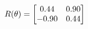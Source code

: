\documentclass[preview]{standalone}
\begin{document}
\begin{align*}
\special{dvisvgm:raw <g id='unique000'>}R(\theta) = \begin{bmatrix}0.44 & 0.90\\-0.90 & 0.44\end{bmatrix}\special{dvisvgm:raw </g>}
\end{align*}
\end{document}
